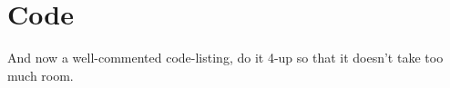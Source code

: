 \chapter{Code}\label{code}

And now a well-commented code-listing, do it 4-up so that it doesn't
take too much room.
